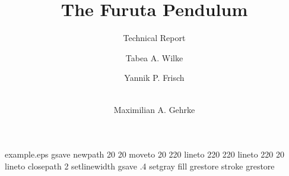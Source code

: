 %
%
%
%
%
\begin{filecontents*}{example.eps}
gsave
newpath
  20 20 moveto
  20 220 lineto
  220 220 lineto
  220 20 lineto
closepath
2 setlinewidth
gsave
  .4 setgray fill
grestore
stroke
grestore
\end{filecontents*}
%
\RequirePackage{fix-cm}
%
\documentclass[smallextended, natbib]{svjour3}       %
%
\smartqed  %
%
\usepackage{graphicx}
\usepackage{tikz}

%
 \usepackage{mathptmx}      %
%
\usepackage{amsmath}
\usepackage{gensymb}
%
%
%


\title{The Furuta Pendulum
}
\subtitle{Technical Report}


\author{Tabea A. Wilke \and Yannik P. Frisch \and \\Maximilian A. Gehrke
}


